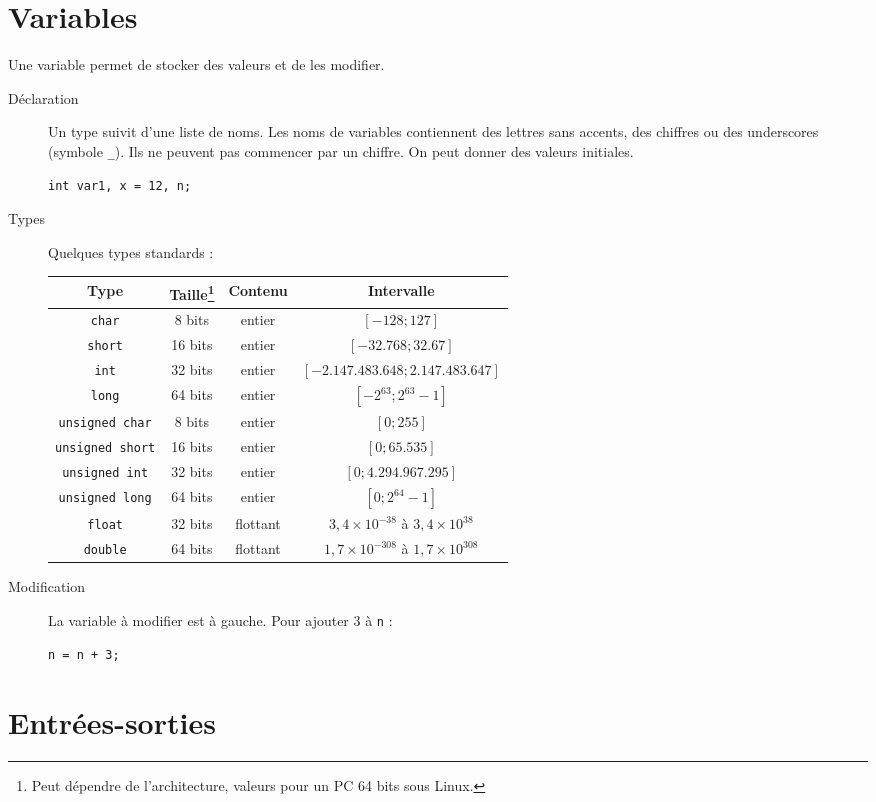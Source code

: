\documentclass[a4paper,11pt]{article}
\begin{document}
  \section{Variables}
  Une variable permet de stocker des valeurs et de les modifier.
  \begin{description}
    \item[Déclaration] Un type suivit d'une liste de noms. Les noms de variables contiennent des lettres sans accents, des chiffres ou des underscores (symbole \texttt{\_}). Ils ne peuvent pas commencer par un chiffre. On peut donner des valeurs initiales.
      \begin{verbatim}
int var1, x = 12, n;
      \end{verbatim}
    \item[Types] Quelques types standards :\\
      \begin{tabu}{c|c|c|c}
        Type & Taille\footnote{Peut dépendre de l'architecture, valeurs pour un PC 64 bits sous Linux.} & Contenu & Intervalle\\
        \hline
        \texttt{char} & 8 bits & entier & $[- 128; 127]$\\
        \texttt{short} & 16 bits & entier & $[-32.768; 32 .67]$\\
        \texttt{int} & 32 bits & entier & $[- 2.147.483.648; 2.147.483.647]$\\
        \texttt{long} & 64 bits & entier & $[- 2^{63}; 2^{63} - 1]$\\
        \hline
        \texttt{unsigned char} & 8 bits & entier & $[0; 255]$\\
        \texttt{unsigned short} & 16 bits & entier & $[0; 65.535]$\\
        \texttt{unsigned int} & 32 bits & entier & $[0; 4.294.967.295]$\\
        \texttt{unsigned long} & 64 bits & entier & $[0; 2^{64} - 1]$\\
        \hline
        \texttt{float} & 32 bits & flottant & $3,4 \times 10^{-38}$ à $3,4 \times 10^{38}$\\
        \texttt{double} & 64 bits & flottant & $1,7 \times 10^{-308}$ à $1,7 \times 10^{308}$
      \end{tabu}
    \item[Modification] La variable à modifier est à gauche. Pour ajouter 3 à \texttt{n} :
      \begin{verbatim}
n = n + 3;
      \end{verbatim}
  \end{description}
  
  \section{Entrées-sorties}
\end{document}
